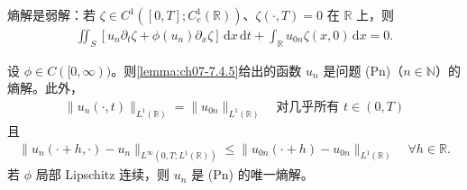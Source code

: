 \documentclass[../../main.tex]{subfiles}%
\begin{document}
\begin{remark}\label{remark:ch07-7.4.1}
熵解是弱解：若 $\zeta\in C^1([0,T];C^1_c(\mathbb{R}))$、$\zeta(\cdot,T)=0$ 在 $\mathbb{R}$ 上，则
\begin{align}
\iint_S[u_n\partial_t\zeta+\phi(u_n)\partial_x\zeta]\,\mathrm{d}x\,\mathrm{d}t
+\int_{\mathbb{R}}u_{0n}\zeta(x,0)\,\mathrm{d}x=0. \label{align:ch07-7.78}
\end{align}
\end{remark}

\begin{proposition}\label{proposition:ch07-7.4.7}
设 $\phi\in C([0,\infty))$。则\cref{lemma:ch07-7.4.5}给出的函数 $u_n$ 是问题 (Pn)（$n\in\mathbb{N}$）的熵解。此外，
\begin{align}
\|u_n(\cdot,t)\|_{L^1(\mathbb{R})}=\|u_{0n}\|_{L^1(\mathbb{R})}\quad\text{对几乎所有 }t\in(0,T) \label{align:ch07-7.79}
\end{align}
且
\begin{align}
\|u_n(\cdot+h,\cdot)-u_n\|_{L^\infty(0,T;L^1(\mathbb{R}))}
\leqslant\|u_{0n}(\cdot+h)-u_{0n}\|_{L^1(\mathbb{R})}\quad\forall h\in\mathbb{R}. \label{align:ch07-7.80}
\end{align}
若 $\phi$ 局部 Lipschitz 连续，则 $u_n$ 是 (Pn) 的唯一熵解。
\end{proposition}
\end{document}
